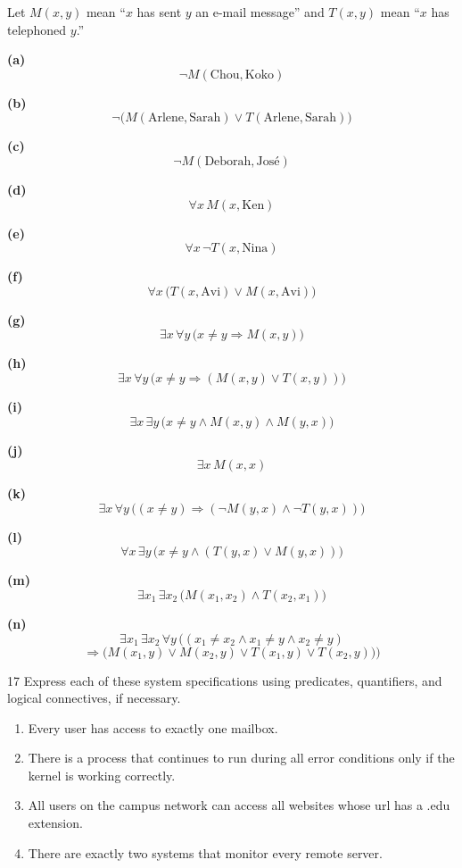 \documentclass[11pt]{article}
\begin{document}
\begin{solution}
Let $M(x,y)$ mean ``$x$ has sent $y$ an e-mail message'' and $T(x,y)$
mean ``$x$ has telephoned $y$.''

\medskip
\noindent\textbf{(a)}
\[
\neg M(\text{Chou},\text{Koko})
\]

\medskip
\noindent\textbf{(b)}
\[
\neg\big(M(\text{Arlene},\text{Sarah})\vee T(\text{Arlene},\text{Sarah})\big)
\]

\medskip
\noindent\textbf{(c)}
\[
\neg M(\text{Deborah},\text{José})
\]

\medskip
\noindent\textbf{(d)}
\[
\forall x\, M(x,\text{Ken})
\]

\medskip
\noindent\textbf{(e)}
\[
\forall x\,\neg T(x,\text{Nina})
\]

\medskip
\noindent\textbf{(f)}
\[
\forall x\,\big(T(x,\text{Avi})\vee M(x,\text{Avi})\big)
\]

\medskip
\noindent\textbf{(g)}
\[
\exists x\,\forall y\,\big(x\neq y \Rightarrow M(x,y)\big)
\]

\medskip
\noindent\textbf{(h)}
\[
\exists x\,\forall y\,\big(x\neq y \Rightarrow (M(x,y)\vee T(x,y))\big)
\]

\medskip
\noindent\textbf{(i)}
\[
\exists x\,\exists y\,\big(x\neq y\wedge M(x,y)\wedge M(y,x)\big)
\]

\medskip
\noindent\textbf{(j)}
\[
\exists x\, M(x,x)
\]

\medskip
\noindent\textbf{(k)}
\[
\exists x\,\forall y\,\big((x\neq y)\Rightarrow(\neg M(y,x)\wedge \neg T(y,x))\big)
\]

\medskip
\noindent\textbf{(l)}
\[
\forall x\,\exists y\,\big(x\neq y\wedge(T(y,x)\vee M(y,x))\big)
\]

\medskip
\noindent\textbf{(m)}
\[
\exists x_1\,\exists x_2\,\big(M(x_1,x_2)\wedge T(x_2,x_1)\big)
\]

\medskip
\noindent\textbf{(n)}
\[
\exists x_1\,\exists x_2\,\forall y\,\Big((x_1\neq x_2\wedge x_1\neq y\wedge x_2\neq y)
\]
\[
\Rightarrow\big(M(x_1,y)\vee M(x_2,y)\vee T(x_1,y)\vee T(x_2,y)\big)\Big)
\]
\end{solution}

\begin{exercise}{17}
    Express each of these system specifications using predicates,
    quantifiers, and logical connectives, if necessary.
    \begin{enumerate}[label=(\alph*)]
        \item Every user has access to exactly one mailbox.
        \item There is a process that continues to run during all error conditions only if the kernel is working correctly.
        \item All users on the campus network can access all websites whose url has a .edu extension.
        \item There are exactly two systems that monitor every remote server.
    \end{enumerate}
\end{exercise}
\end{document}
